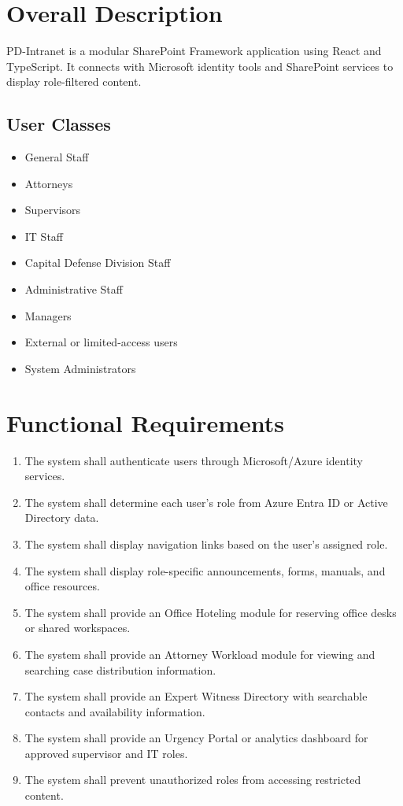 \documentclass[12pt]{article}
\begin{document}
\section{Overall Description}
PD-Intranet is a modular SharePoint Framework application using React and TypeScript. It connects with Microsoft identity tools and SharePoint services to display role-filtered content.

\subsection{User Classes}
\begin{itemize}
\item General Staff
\item Attorneys
\item Supervisors
\item IT Staff
\item Capital Defense Division Staff
\item Administrative Staff
\item Managers
\item External or limited-access users
\item System Administrators
\end{itemize}

\section{Functional Requirements}
\begin{enumerate}[label=FR-\arabic*]
\item The system shall authenticate users through Microsoft/Azure identity services.
\item The system shall determine each user's role from Azure Entra ID or Active Directory data.
\item The system shall display navigation links based on the user's assigned role.
\item The system shall display role-specific announcements, forms, manuals, and office resources.
\item The system shall provide an Office Hoteling module for reserving office desks or shared workspaces.
\item The system shall provide an Attorney Workload module for viewing and searching case distribution information.
\item The system shall provide an Expert Witness Directory with searchable contacts and availability information.
\item The system shall provide an Urgency Portal or analytics dashboard for approved supervisor and IT roles.
\item The system shall prevent unauthorized roles from accessing restricted content.
\end{enumerate}
\end{document}
